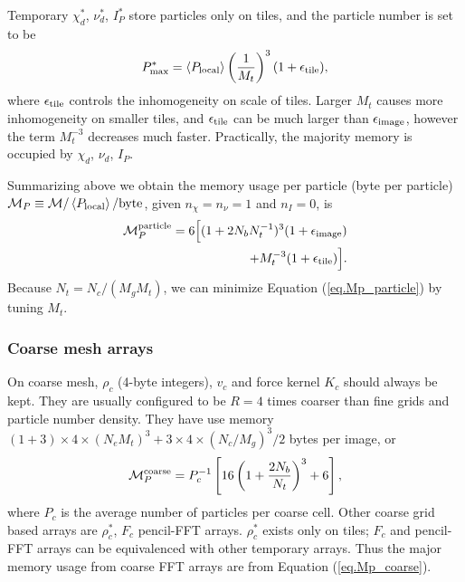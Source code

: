 \documentclass[10pt,twocolumn,preprint]{emulateapj}
\begin{document}
Temporary $\chi_d^*$, $\nu_d^*$, $I_P^*$ store particles only on tiles, and the particle number is set to be
\begin{equation}\label{eq.nptile}
	P_{\rm max}^*=\left\langle P_{\rm local} \right\rangle \left( \frac{1}{M_t} \right)^3(1+\epsilon_{\rm tile}),
\end{equation}
where $\epsilon_{\rm tile}$ controls the inhomogeneity on scale of tiles. Larger $M_t$ causes more inhomogeneity on smaller tiles, and $\epsilon_{\rm tile}$ can be much larger than $\epsilon_{\rm image}$, however the term $M_t^{-3}$ decreases much faster. Practically, the majority memory is occupied by $\chi_d$, $\nu_d$, $I_P$.

Summarizing above we obtain the memory usage per particle (byte per particle) ${\mathcal M}_P \equiv {\mathcal M} / \left\langle P_{\rm local} \right\rangle/{\rm byte}$, given $n_\chi=n_\nu=1$ and $n_I=0$, is
\begin{eqnarray}\label{eq.Mp_particle}
\nonumber\mathcal{M}_P^{\rm particle}=6\Big [ (1+2N_b N_t^{-1})^3(1+\epsilon_{\rm image} )\\ 
	+M_t^{-3}(1+\epsilon_{\rm tile})\Big ].
\end{eqnarray}
Because $N_t=N_c/(M_g M_t)$, we can minimize Equation (\ref{eq.Mp_particle}) by tuning $M_t$.
	
\subsubsection{Coarse mesh arrays}
On coarse mesh, $\rho_c$ (4-byte integers), $v_c$ and force kernel $K_c$ should always be kept. They are usually configured to be $R=4$ times coarser than fine grids and particle number density. They have use memory $(1+3)\times 4\times(N_e M_t)^3+3\times 4\times(N_c/M_g)^3/2$ bytes per image, or
\begin{equation}\label{eq.Mp_coarse}
	\mathcal{M}_P^{\rm coarse}=P_c^{-1} \left [ 16\left( 1+\frac{2N_b}{N_t} \right)^3+6 \right ],
\end{equation}
where $P_c$ is the average number of particles per coarse cell. Other coarse grid based arrays are $\rho_c^*$, $F_c$ pencil-FFT arrays. $\rho_c^*$ exists only on tiles; $F_c$ and pencil-FFT arrays can be equivalenced with other temporary arrays. Thus the major memory usage from coarse FFT arrays are from Equation (\ref{eq.Mp_coarse}).
\end{document}
